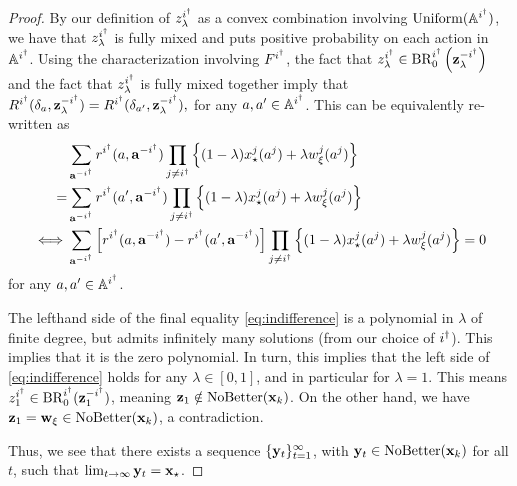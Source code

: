 \begin{proof}
By our definition of $z^{i^{\dagger}}_{\lambda}$ as a convex combination involving ${\rm Uniform}(\mathbb{A}^{i^{\dagger}})$, we have that $z^{i^{\dagger}}_{\lambda}$ is fully mixed and puts positive probability on each action in $\mathbb{A}^{i^{\dagger}}$. Using the characterization involving $F^{i^{\dagger}}$, the fact that $z^{i^{\dagger}}_{\lambda} \in {\rm BR}^{i^{\dagger}}_0 \left( {\mathbf{z}}^{-i^{\dagger}}_\lambda \right)$ and the fact that $z^{i^{\dagger}}_\lambda$ is fully mixed together imply that $R^{i^{\dagger}} ( \delta_a , {\mathbf{z}}^{-i^{\dagger}}_{\lambda} ) =  R^{i^{\dagger}} ( \delta_{a'} , {\mathbf{z}}^{-i^{\dagger}}_{\lambda} ),$ for any $a, a' \in \mathbb{A}^{i^{\dagger}}$. This can be equivalently re-written as
%
%
\begin{align}
  &\sum_{\ba^{-\idagger}} r^{\idagger} (a, \ba^{-\idagger}) \prod_{j \not= \idagger} \left\{ (1-\lambda) x^j_{\star} ( a^j ) + \lambda w^j_{\xi} ( a^j ) \right\} \nonumber \\
= &\sum_{\ba^{-\idagger}} r^{\idagger} (a', \ba^{-\idagger}) \prod_{j \not= \idagger} \left\{ (1-\lambda) x^j_{\star} ( a^j ) + \lambda w^j_{\xi} ( a^j ) \right\} \nonumber \\
%
\iff &\sum_{\ba^{-\idagger}} \left[ r^{\idagger} (a, \ba^{-\idagger}) - r^{\idagger} (a', \ba^{-\idagger}) \right] \prod_{j \not= \idagger} \left\{ (1-\lambda) x^j_{\star} ( a^j ) + \lambda w^j_{\xi} ( a^j ) \right\} = 0
%
\label{eq:indifference}
\end{align}
for any $a, a' \in \mathbb{A}^{i^{\dagger}}$. 


The lefthand side of the final equality \eqref{eq:indifference} is a polynomial in $\lambda$ of finite degree, but admits infinitely many solutions (from our choice of $i^{\dagger}$). This implies that it is the zero polynomial. In turn, this implies that the left side of \eqref{eq:indifference} holds for any $\lambda \in [0,1]$, and in particular for $\lambda = 1$. This means $z^{i^{\dagger}}_1 \in {\rm BR}^{i^{\dagger}}_0 ( {\mathbf{z}}^{-i^{\dagger}}_1 )$, meaning ${\mathbf{z}}_1 \notin {\rm NoBetter}({\mathbf{x}}_k)$. On the other hand, we have  ${\mathbf{z}}_1 = {\mathbf{w}}_{\xi} \in {\rm NoBetter}({\mathbf{x}}_k)$, a contradiction. 

Thus, we see that there exists a sequence $\{ {\mathbf{y}}_t \}_{t = 1}^{\infty}$, with ${\mathbf{y}}_t \in {\rm NoBetter}({\mathbf{x}}_k)$ for all $t$, such that $\lim_{t \to \infty} {\mathbf{y}}_t = {\mathbf{x}}_{\star}$.
%
\end{proof} 



